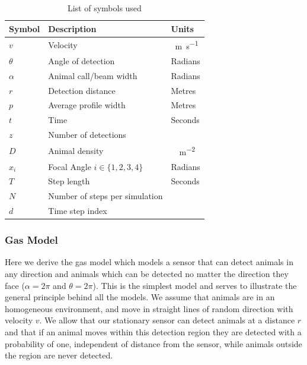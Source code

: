 \documentclass[a4paper,10pt,reqno,oneside]{amsart}
\begin{document}
\begin{table}[t]
\centering
\begin{tabular}{lll}
Symbol 	& Description & Units\\\hline
$v$		& Velocity & \SI{}{\meter\per\second}\\
$\theta$	& Angle of detection & Radians \\
$\alpha$	& Animal call/beam width & Radians \\
$r$ 		& Detection distance & Metres\\
$p$ 		& Average profile width & Metres\\
$t$		& Time & Seconds\\
$z$		& Number of detections & \\
$D$		& Animal density & \SI{}{\animals\per\meter\squared} \\
$x_i$	        & Focal Angle $i \in \{1,2,3,4\} $ 	& Radians\\
$T$ 		& Step length & Seconds\\
$N$ 		& Number of steps per simulation & \\
$d$ 		& Time step index &

\end{tabular}
\caption{List of symbols used}
\label{t:paras}
\end{table}


\subsubsection{Gas Model}

Here we derive the gas model which models a sensor that can detect animals in any direction and animals which can be detected no matter the direction they face ($ \alpha =  2\pi$ and $ \theta =  2\pi$). This is the simplest model and serves to illustrate the general principle behind all the models. We assume that animals are in an homogeneous environment, and move in straight lines of random direction with velocity $v$. We allow that our stationary sensor can detect animals at a distance $r$ and that if an animal moves within this detection region they are detected with a probability of one, independent of distance from the sensor, while animals outside the region are never detected.
\end{document}
